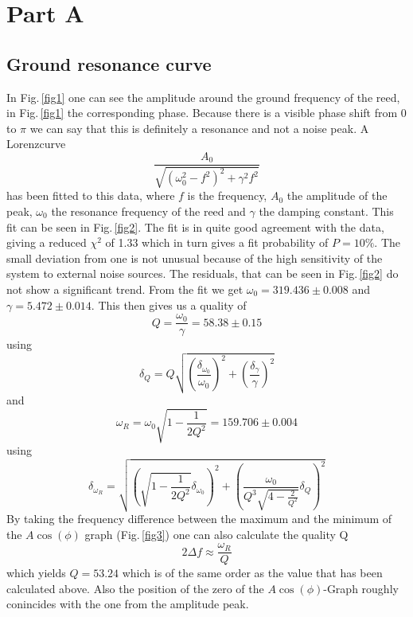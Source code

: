 \section{Part A}

\subsection{Ground resonance curve}

In Fig.\,\ref{fig1} one can see the amplitude around the ground frequency of the reed, in Fig.\,\ref{fig1} the corresponding phase. Because there is a visible phase shift from 0 to $\pi$ we can say that this is definitely a resonance and not a noise peak. A Lorenzcurve
\begin{equation}
	 \frac{A_0}{\sqrt{(\omega_0^2-f^2)^2+\gamma^2f^2}}
\end{equation}
has been fitted to this data, where $f$ is the frequency, $A_0$ the amplitude of the peak, $\omega_0$ the resonance frequency of the reed and $\gamma$ the damping constant. This fit can be seen in Fig.\,\ref{fig2}. The fit is in quite good agreement with the data, giving a reduced $\chi^2$ of 1.33 which in turn gives a fit probability of $P = 10\%$. The small deviation from one is not unusual because of the high sensitivity of the system to external noise sources. The residuals, that can be seen in Fig.\,\ref{fig2} do not show a significant trend. From the fit we get $\omega_0 = 319.436\pm0.008$ and $\gamma = 5.472\pm0.014$. This then gives us a quality of
\begin{equation}
	Q = \frac{\omega_0}{\gamma} = 58.38\pm0.15
\end{equation}
using
\begin{equation}
	\delta_Q = Q\sqrt{\left(\frac{\delta_{\omega_0}}{\omega_0}\right)^2+\left(\frac{\delta_{\gamma}}{\gamma}\right)^2}
\end{equation}
and 
\begin{equation}
	\omega_R = \omega_0\sqrt{1- \frac{1}{2Q^2}} = 159.706\pm0.004
\end{equation}
using
\begin{equation}
	\delta_{\omega_R} = \sqrt{\left(\sqrt{1-\frac{1}{2Q^2}}\delta_{\omega_0}\right)^2+ \left(\frac{\omega_0}{Q^3\sqrt{4- \frac{2}{Q^2}}}\delta_{Q}\right)^2}
\end{equation}
By taking the frequency difference between the maximum and the minimum of the $A\cos(\phi)$ graph (Fig.\,\ref{fig3}) one can also calculate the quality Q
\begin{equation}
	2 \Delta f \approx \frac{\omega_R}{Q}
\end{equation}
which yields $Q = 53.24$ which is of the same order as the value that has been calculated above. Also the position of the zero of the $A\cos(\phi)$-Graph roughly conincides with the one from the amplitude peak.



